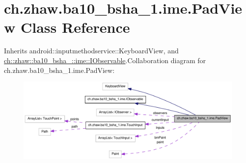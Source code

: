 \hypertarget{classch_1_1zhaw_1_1ba10__bsha__1_1_1ime_1_1PadView}{
\section{ch.zhaw.ba10\_\-bsha\_\-1.ime.PadView Class Reference}
\label{classch_1_1zhaw_1_1ba10__bsha__1_1_1ime_1_1PadView}
}


Inherits android::inputmethodservice::KeyboardView, and \hyperlink{interfacech_1_1zhaw_1_1ba10__bsha__1_1_1ime_1_1IObservable}{ch::zhaw::ba10\_\-bsha\_::ime::IObservable}.Collaboration diagram for ch.zhaw.ba10\_\-bsha\_\-1.ime.PadView:\nopagebreak
\begin{figure}[H]
\begin{center}
\leavevmode
\includegraphics[width=400pt]{classch_1_1zhaw_1_1ba10__bsha__1_1_1ime_1_1PadView__coll__graph}
\end{center}
\end{figure}
